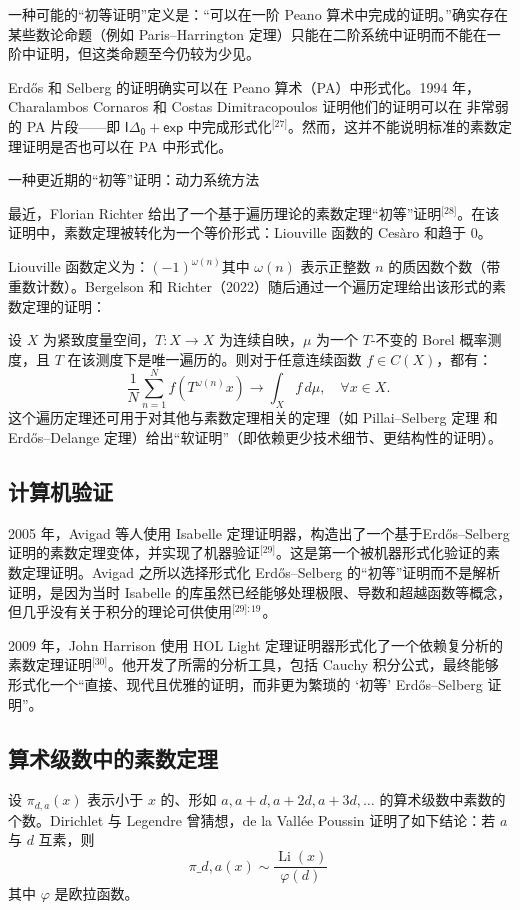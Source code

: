 一种可能的“初等证明”定义是：“可以在一阶 Peano 算术中完成的证明。”确实存在某些数论命题（例如 Paris–Harrington 定理）只能在二阶系统中证明而不能在一阶中证明，但这类命题至今仍较为少见。

Erdős 和 Selberg 的证明确实可以在 Peano 算术（PA）中形式化。1994 年，Charalambos Cornaros 和 Costas Dimitracopoulos 证明他们的证明可以在 非常弱的 PA 片段——即 $\mathsf{I\Delta_0 + exp}$ 中完成形式化\(^\text{[27]}\)。然而，这并不能说明标准的素数定理证明是否也可以在 PA 中形式化。

一种更近期的“初等”证明：动力系统方法

最近，Florian Richter 给出了一个基于遍历理论的素数定理“初等”证明\(^\text{[28]}\)。在该证明中，素数定理被转化为一个等价形式：Liouville 函数的 Cesàro 和趋于 0。

Liouville 函数定义为：$(-1)^{\omega(n)}$其中 $\omega(n)$ 表示正整数 $n$ 的质因数个数（带重数计数）。Bergelson 和 Richter（2022）随后通过一个遍历定理给出该形式的素数定理的证明：

设 $X$ 为紧致度量空间，$T: X \to X$ 为连续自映，$\mu$ 为一个 $T$-不变的 Borel 概率测度，且 $T$ 在该测度下是唯一遍历的。则对于任意连续函数 $f \in C(X)$，都有：
$$
\frac{1}{N} \sum_{n=1}^N f(T^{\omega(n)}x) \longrightarrow \int_X f\,d\mu, \quad \forall x \in X.~
$$
这个遍历定理还可用于对其他与素数定理相关的定理（如 Pillai–Selberg 定理 和 Erdős–Delange 定理）给出“软证明”（即依赖更少技术细节、更结构性的证明）。
\subsection{计算机验证}
2005 年，Avigad 等人使用 Isabelle 定理证明器，构造出了一个基于Erdős–Selberg 证明的素数定理变体，并实现了机器验证\(^\text{[29]}\)。这是第一个被机器形式化验证的素数定理证明。Avigad 之所以选择形式化 Erdős–Selberg 的“初等”证明而不是解析证明，是因为当时 Isabelle 的库虽然已经能够处理极限、导数和超越函数等概念，但几乎没有关于积分的理论可供使用\(^\text{[29]: 19 }\)。

2009 年，John Harrison 使用 HOL Light 定理证明器形式化了一个依赖复分析的素数定理证明\(^\text{[30]}\)。他开发了所需的分析工具，包括 Cauchy 积分公式，最终能够形式化一个“直接、现代且优雅的证明，而非更为繁琐的 ‘初等’ Erdős–Selberg 证明”。
\subsection{算术级数中的素数定理}
设 $\pi_{d,a}(x)$ 表示小于 $x$ 的、形如 $a, a + d, a + 2d, a + 3d, \ldots$ 的算术级数中素数的个数。Dirichlet 与 Legendre 曾猜想，de la Vallée Poussin 证明了如下结论：若 $a$ 与 $d$ 互素，则
$$
\pi\_{d,a}(x) \sim \frac{\operatorname{Li}(x)}{\varphi(d)} ~
$$
其中 $\varphi$ 是欧拉函数。

